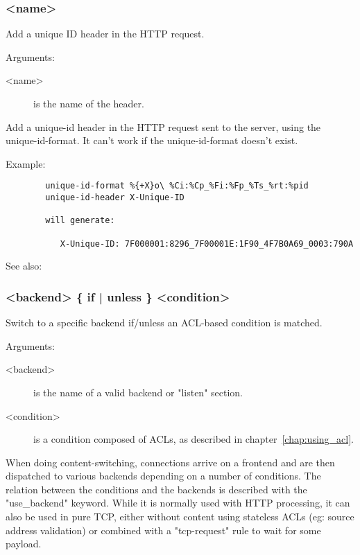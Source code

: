{\subsubsection[unique-id-header]{ <name>}

  Add a unique ID header in the HTTP request.


  Arguments:
  \begin{description}
  \item[<name>] is the name of the header.
  \end{description}

  Add a unique-id header in the HTTP request sent to the server, using the
  unique-id-format. It can't work if the unique-id-format doesn't exist.

  Example:
\begin{verbatim}
        unique-id-format %{+X}o\ %Ci:%Cp_%Fi:%Fp_%Ts_%rt:%pid
        unique-id-header X-Unique-ID

        will generate:

           X-Unique-ID: 7F000001:8296_7F00001E:1F90_4F7B0A69_0003:790A
\end{verbatim}
    See also: 

\subsubsection[use\_backend]{ <backend> \{ if | unless \} <condition>}


  Switch to a specific backend if/unless an ACL-based condition is matched.


  Arguments:
  \begin{description}
  \item[<backend>] is the name of a valid backend or "listen" section.
  \item[<condition>] is a condition composed of ACLs, as described in chapter~\ref{chap:using_acl}.
  \end{description}

  When doing content-switching, connections arrive on a frontend and are then
  dispatched to various backends depending on a number of conditions. The
  relation between the conditions and the backends is described with the
  "use\_backend" keyword. While it is normally used with HTTP processing, it can
  also be used in pure TCP, either without content using stateless ACLs (eg:
  source address validation) or combined with a "tcp-request" rule to wait for
  some payload.

}
